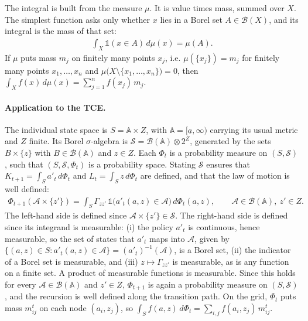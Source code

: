\documentclass[12pt]{article}
\theoremstyle{remark}
\begin{document}
The integral is built from the measure $\mu$. It is value times mass, summed over $X$. The simplest 
function asks only whether $x$ lies in a Borel set $A\in\mathcal{B}(X)$, and its integral is 
the mass of that set:
\begin{align*}
    \int_X \mathds{1}(x\in A)\,d\mu(x) = \mu(A).
\end{align*}
If $\mu$ puts mass $m_j$ on finitely many points $x_j$, i.e. $\mu(\{x_j\})=m_j$ for finitely 
many points $x_1,\dots,x_n$ and $\mu\bigl(X\setminus\{x_1,\dots,x_n\}\bigr)=0$, 
then $\int_X f(x)\,d\mu(x)=\sum_{j=1}^{n} f(x_j)\,m_j$.

\paragraph{Application to the TCE.} The individual state space is $S=\mathbb{A}\times Z$, with 
$\mathbb{A}=[\underline{a},\infty)$ carrying its usual metric and $Z$ finite. 
Its Borel $\sigma$-algebra is $\mathcal{S}=\mathcal{B}(\mathbb{A})\otimes2^{Z}$, 
generated by the sets $B\times\{z\}$ with $B\in\mathcal{B}(\mathbb{A})$ and $z\in Z$. 
Each $\Phi_t$ is a probability measure on $(S,\mathcal{S})$, such that $(S,\mathcal{S},\Phi_t)$ 
is a probability space. 
Stating $\mathcal{S}$ ensures that $K_{t+1}=\int_S a'_t\,d\Phi_t$ 
and $L_t=\int_S z\,d\Phi_t$ are defined, and that the law of motion is well defined:
\begin{align*}
    \Phi_{t+1}(\mathcal{A}\times\{z'\})
    =\int_S \Gamma_{zz'}\,\mathds{1}\bigl(a'_t(a,z)\in\mathcal{A}\bigr)\,d\Phi_t(a,z),
    \qquad \mathcal{A}\in\mathcal{B}(\mathbb{A}),\ z'\in Z.
\end{align*}
The left-hand side is defined since $\mathcal{A}\times\{z'\}\in\mathcal{S}$. The right-hand side 
is defined since its integrand is measurable: (i) the policy $a'_t$ is continuous, hence 
measurable, so the set of states that $a'_t$ maps into $\mathcal{A}$,
given by $\{(a,z)\in S: a'_t(a,z)\in\mathcal{A}\}=(a'_t)^{-1}(\mathcal{A})$,
is a Borel set, (ii) the indicator of a Borel set is measurable,
 and (iii) $z\mapsto\Gamma_{zz'}$ 
is measurable, as is any function on a finite set. A product of measurable functions is measurable. 
Since this holds for every $\mathcal{A}\in\mathcal{B}(\mathbb{A})$ and $z'\in Z$, $\Phi_{t+1}$ is 
again a probability measure on $(S,\mathcal{S})$, and the recursion is well defined along the 
transition path. On the grid, $\Phi_t$ puts mass $m^t_{ij}$ on each node $(a_i,z_j)$, so 
$\int_S f(a,z)\,d\Phi_t=\sum_{i,j}f(a_i,z_j)\,m^t_{ij}$.
\end{document}
